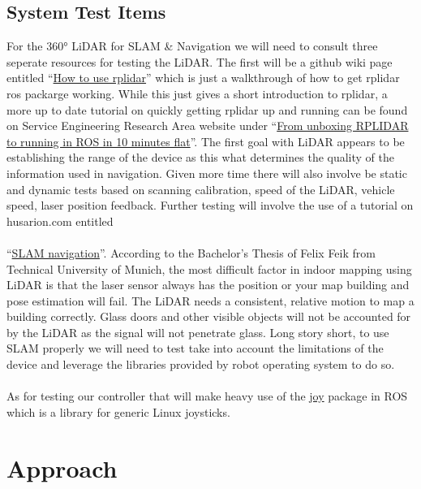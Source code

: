 \documentclass[english,12pt]{article}
\begin{document}
\subsection{System Test Items}
For the \ang{360} LiDAR for SLAM \& Navigation we will need to consult three seperate 
resources for testing the LiDAR. The first will be a github wiki page entitled 
``\href{https://github.com/robopeak/rplidar_ros/wiki/How-to-use-rplidar}{How to use rplidar}'' 
which is just a walkthrough of how to get rplidar ros packarge working. While this just gives 
a short introduction to rplidar, a more up to date tutorial on quickly getting rplidar up and 
running can be found on Service Engineering Research Area website under 
``\href{https://blog.zhaw.ch/icclab/rplidar/}{From unboxing RPLIDAR to running in ROS in 10 
minutes flat}''. The first goal with LiDAR appears to be establishing the range of the device 
as this what determines the quality of the information used in navigation. Given more time 
there will also involve be static and dynamic tests based on scanning calibration, 
speed of the LiDAR, vehicle speed, laser position feedback. Further testing will involve the use 
of a tutorial on husarion.com entitled \\\\
``\href{https://husarion.com/tutorials/ros-tutorials/6-slam-navigation/}{SLAM navigation}''. 
According to the Bachelor's Thesis of Felix Feik from Technical University of Munich,
the most difficult factor in indoor mapping using LiDAR is that the laser sensor always has 
the position or your map building and pose estimation will fail. The LiDAR needs a consistent, 
relative motion to map a building correctly. Glass doors and other visible objects will not 
be accounted for by the LiDAR as the signal will not penetrate glass. Long story short, to use 
SLAM properly we will need to test take into account the limitations of the device and leverage 
the libraries provided by robot operating system to do so. \\\\

As for testing our controller that will make heavy use of the 
\href{http://wiki.ros.org/joy#Microsoft_Xbox_360_Wired_Controller_for_Linux}{joy} 
package in ROS which is a library for generic Linux joysticks. 

\section{Approach}
\end{document}
